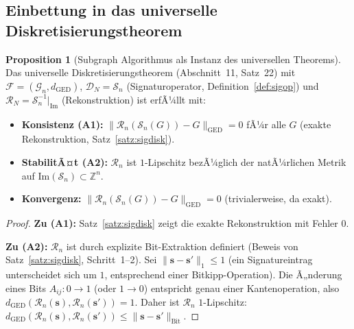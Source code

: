 ﻿\documentclass[a4paper,12pt]{article}
\theoremstyle{definition}
\newtheorem{proposition}{Proposition}
\begin{document}
\subsection{Einbettung in das universelle Diskretisierungstheorem}

\begin{proposition}[Subgraph Algorithmus als Instanz des universellen Theorems]
\label{prop:universal}
    Das universelle Diskretisierungstheorem (Abschnitt~11, Satz~22) mit
    $\mathcal{F} = (\mathcal{G}_n, d_{\mathrm{GED}})$,
    $\mathcal{D}_N = \mathcal{S}_n$ (Signaturoperator, Definition~\ref{def:sigop}) und
    $\mathcal{R}_N = \mathcal{S}_n^{-1}|_{\mathrm{Im}}$ (Rekonstruktion) ist erfÃ¼llt mit:
    \begin{itemize}
        \item \textbf{Konsistenz (A1):} $\|\mathcal{R}_n(\mathcal{S}_n(G)) - G\|_{\mathrm{GED}} = 0$
              fÃ¼r alle $G$ (exakte Rekonstruktion, Satz~\ref{satz:sigdisk}).
        \item \textbf{StabilitÃ¤t (A2):} $\mathcal{R}_n$ ist $1$-Lipschitz bezÃ¼glich der
              natÃ¼rlichen Metrik auf $\mathrm{Im}(\mathcal{S}_n) \subset \mathbb{Z}^n$.
        \item \textbf{Konvergenz:} $\|\mathcal{R}_n(\mathcal{S}_n(G)) - G\|_{\mathrm{GED}} = 0$
              (trivialerweise, da exakt).
    \end{itemize}
\end{proposition}

\begin{proof}
    \textbf{Zu (A1):} Satz~\ref{satz:sigdisk} zeigt die exakte Rekonstruktion mit Fehler 0.

    \textbf{Zu (A2):} $\mathcal{R}_n$ ist durch explizite Bit-Extraktion definiert
    (Beweis von Satz~\ref{satz:sigdisk}, Schritt~1--2). Sei
    $\|\mathbf{s} - \mathbf{s}'\|_1 \leq 1$ (ein Signatureintrag unterscheidet sich um $1$,
    entsprechend einer Bitkipp-Operation). Die Ã„nderung eines Bits $A_{ij}: 0 \to 1$
    (oder $1 \to 0$) entspricht genau einer Kantenoperation, also
    $d_{\mathrm{GED}}(\mathcal{R}_n(\mathbf{s}), \mathcal{R}_n(\mathbf{s}')) = 1$.
    Daher ist $\mathcal{R}_n$ $1$-Lipschitz: $d_{\mathrm{GED}}(\mathcal{R}_n(\mathbf{s}),
    \mathcal{R}_n(\mathbf{s}')) \leq \|\mathbf{s} - \mathbf{s}'\|_{\mathrm{Bit}}$. \qedhere
\end{proof}
\end{document}
